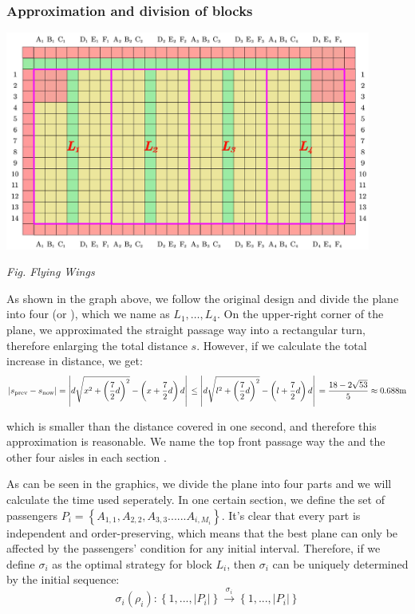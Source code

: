 \documentclass{article}
\theoremstyle{definition}
\theoremstyle{remark}
\numberwithin{equation}{section}
\begin{document}
	\subsubsection{Approximation and division of blocks}

	\begin{center}
		\includegraphics[width=12cm]{flyingwings.jpg}

		\small \textit{Fig. Flying Wings}
	\end{center}

	As shown in the graph above, we follow the original design and divide the plane into four  (or ), which we name as \(L_1,\ldots,L_4\). On the upper-right corner of the plane, we approximated the straight passage way into a rectangular turn, therefore enlarging the total distance \(s\). However, if we calculate the total increase in distance, we get:
	$$\left| s_{\mathrm{prev}}-s_{\mathrm{now}} \right|=\left| d\sqrt{x^2+\left( \frac{7}{2}d \right) ^2}-\left( x+\frac{7}{2}d \right) d \right|\\\le \left| d\sqrt{l^2+\left( \frac{7}{2}d \right) ^2}-\left( l+\frac{7}{2}d \right) d \right|\\=\frac{18-2\sqrt{53}}{5}\approx 0.688\mathrm{m}\\$$

	which is smaller than the distance covered in one second, and therefore this approximation is reasonable. We name the top front passage way the  and the other four aisles in each section .

	As can be seen in the graphics, we divide the plane into four parts and we will calculate the time used seperately. In one certain section, we define the set of passengers $P_i=\left\{A_{1,1},A_{2,2},A_{3,3}......A_{i,M_i}\right\}$. It's clear that every part is independent and order-preserving, which means that the best plane can only be affected by the passengers' condition for any initial interval. Therefore, if we define \(\sigma_i\) as the optimal strategy for block \(L_i\), then \(\sigma_i\) can be uniquely determined by the initial sequence:
	\[\sigma_i (\rho_i): \left\{1,..., \left|P_i\right|\right\}\xrightarrow{\sigma_i} \left\{1,..., \left|P_i\right| \right\}\]
\end{document}

